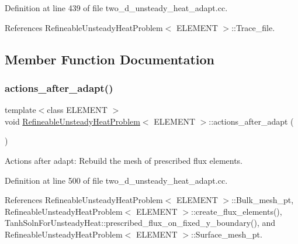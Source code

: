 Definition at line 439 of file two\+\_\+d\+\_\+unsteady\+\_\+heat\+\_\+adapt.\+cc.



References Refineable\+Unsteady\+Heat\+Problem$<$ E\+L\+E\+M\+E\+N\+T $>$\+::\+Trace\+\_\+file.



\subsection{Member Function Documentation}
\mbox{\label{classRefineableUnsteadyHeatProblem_a1f8a9e91269440c799a2075f989d62b1}} 
\subsubsection{\texorpdfstring{actions\+\_\+after\+\_\+adapt()}{actions\_after\_adapt()}}
{\footnotesize\ttfamily template$<$class E\+L\+E\+M\+E\+NT $>$ \\
void \hyperlink{classRefineableUnsteadyHeatProblem}{Refineable\+Unsteady\+Heat\+Problem}$<$ E\+L\+E\+M\+E\+NT $>$\+::actions\+\_\+after\+\_\+adapt (\begin{DoxyParamCaption}{ }\end{DoxyParamCaption})}



Actions after adapt\+: Rebuild the mesh of prescribed flux elements. 



Definition at line 500 of file two\+\_\+d\+\_\+unsteady\+\_\+heat\+\_\+adapt.\+cc.



References Refineable\+Unsteady\+Heat\+Problem$<$ E\+L\+E\+M\+E\+N\+T $>$\+::\+Bulk\+\_\+mesh\+\_\+pt, Refineable\+Unsteady\+Heat\+Problem$<$ E\+L\+E\+M\+E\+N\+T $>$\+::create\+\_\+flux\+\_\+elements(), Tanh\+Soln\+For\+Unsteady\+Heat\+::prescribed\+\_\+flux\+\_\+on\+\_\+fixed\+\_\+y\+\_\+boundary(), and Refineable\+Unsteady\+Heat\+Problem$<$ E\+L\+E\+M\+E\+N\+T $>$\+::\+Surface\+\_\+mesh\+\_\+pt.

\mbox{\label{classRefineableUnsteadyHeatProblem_aa740f2eb1b3909100a04709b401c0b41}} 
